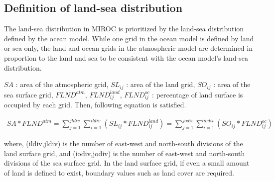 \hypertarget{definition-of-land-sea-distribution}{%
\subsection{Definition of land-sea
distribution}\label{definition-of-land-sea-distribution}}

The land-sea distribution in MIROC is prioritized by the land-sea
distribution defined by the ocean model. While one grid in the ocean
model is defined by land or sea only, the land and ocean grids in the
atmospheric model are determined in proportion to the land and sea to be
consistent with the ocean model's land-sea distribution.

\(SA\) : area of the atmospheric grid, \(SL _ {ij}\) : area of the land
grid, \(SO _ {ij}\) : area of the sea surface grid, \(FLND^{atm}\),
\(FLND^{land} _ {ij}\), \(FLND^{oc} _ {ij}\) : percentage of land
surface is occupied by each grid. Then, following equation is satisfied.

\begin{eqnarray} SA*FLND^{atm} = \sum _ {j=1}^{jldiv}\sum _ {i=1}^{ildiv}(SL _ {ij}*FLND^{land} _ {ij}) = \sum _ {j=1}^{jodiv}\sum _ {i=1}^{iodiv}(SO _ {ij}*FLND^{oc } _{ij}) \end{eqnarray}

where, (ildiv,jldiv) is the number of east-west and north-south
divisions of the land surface grid, and (iodiv,jodiv) is the number of
east-west and north-south divisions of the sea surface grid. In the land
surface grid, if even a small amount of land is defined to exist,
boundary values such as land cover are required.
